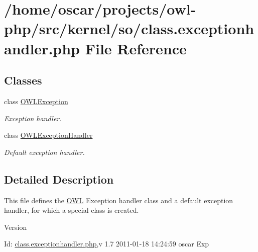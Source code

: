 \section{/home/oscar/projects/owl-\/php/src/kernel/so/class.exceptionhandler.php File Reference}
\label{class_8exceptionhandler_8php}
\subsection*{Classes}
\begin{DoxyCompactItemize}
\item 
class \hyperlink{classOWLException}{OWLException}
\begin{DoxyCompactList}\small\item\em Exception handler. \item\end{DoxyCompactList}\item 
class \hyperlink{classOWLExceptionHandler}{OWLExceptionHandler}
\begin{DoxyCompactList}\small\item\em Default exception handler. \item\end{DoxyCompactList}\end{DoxyCompactItemize}


\subsection{Detailed Description}
This file defines the \hyperlink{classOWL}{OWL} Exception handler class and a default exception handler, for which a special class is created. \begin{DoxyVersion}{Version}

\end{DoxyVersion}
\begin{DoxyParagraph}{Id:}
\hyperlink{class_8exceptionhandler_8php}{class.exceptionhandler.php},v 1.7 2011-\/01-\/18 14:24:59 oscar Exp 
\end{DoxyParagraph}
